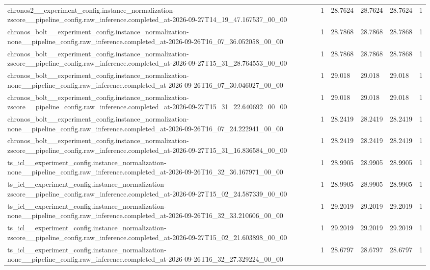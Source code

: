 \begin{tabular}{llllll}
chronos2\_\_experiment\_config.instance\_normalization-zscore\_\_pipeline\_config.raw\_inference.completed\_at-2026-09-27T14\_19\_47.167537\_00\_00 & 1 & 28.7624 & 28.7624 & 28.7624 & 1 \\
chronos\_bolt\_\_experiment\_config.instance\_normalization-none\_\_pipeline\_config.raw\_inference.completed\_at-2026-09-26T16\_07\_36.052058\_00\_00 & 1 & 28.7868 & 28.7868 & 28.7868 & 1 \\
chronos\_bolt\_\_experiment\_config.instance\_normalization-zscore\_\_pipeline\_config.raw\_inference.completed\_at-2026-09-27T15\_31\_28.764553\_00\_00 & 1 & 28.7868 & 28.7868 & 28.7868 & 1 \\
chronos\_bolt\_\_experiment\_config.instance\_normalization-none\_\_pipeline\_config.raw\_inference.completed\_at-2026-09-26T16\_07\_30.046027\_00\_00 & 1 & 29.018 & 29.018 & 29.018 & 1 \\
chronos\_bolt\_\_experiment\_config.instance\_normalization-zscore\_\_pipeline\_config.raw\_inference.completed\_at-2026-09-27T15\_31\_22.640692\_00\_00 & 1 & 29.018 & 29.018 & 29.018 & 1 \\
chronos\_bolt\_\_experiment\_config.instance\_normalization-none\_\_pipeline\_config.raw\_inference.completed\_at-2026-09-26T16\_07\_24.222941\_00\_00 & 1 & 28.2419 & 28.2419 & 28.2419 & 1 \\
chronos\_bolt\_\_experiment\_config.instance\_normalization-zscore\_\_pipeline\_config.raw\_inference.completed\_at-2026-09-27T15\_31\_16.836584\_00\_00 & 1 & 28.2419 & 28.2419 & 28.2419 & 1 \\
ts\_icl\_\_experiment\_config.instance\_normalization-none\_\_pipeline\_config.raw\_inference.completed\_at-2026-09-26T16\_32\_36.167971\_00\_00 & 1 & 28.9905 & 28.9905 & 28.9905 & 1 \\
ts\_icl\_\_experiment\_config.instance\_normalization-zscore\_\_pipeline\_config.raw\_inference.completed\_at-2026-09-27T15\_02\_24.587339\_00\_00 & 1 & 28.9905 & 28.9905 & 28.9905 & 1 \\
ts\_icl\_\_experiment\_config.instance\_normalization-none\_\_pipeline\_config.raw\_inference.completed\_at-2026-09-26T16\_32\_33.210606\_00\_00 & 1 & 29.2019 & 29.2019 & 29.2019 & 1 \\
ts\_icl\_\_experiment\_config.instance\_normalization-zscore\_\_pipeline\_config.raw\_inference.completed\_at-2026-09-27T15\_02\_21.603898\_00\_00 & 1 & 29.2019 & 29.2019 & 29.2019 & 1 \\
ts\_icl\_\_experiment\_config.instance\_normalization-none\_\_pipeline\_config.raw\_inference.completed\_at-2026-09-26T16\_32\_27.329224\_00\_00 & 1 & 28.6797 & 28.6797 & 28.6797 & 1 \\

\end{tabular}
